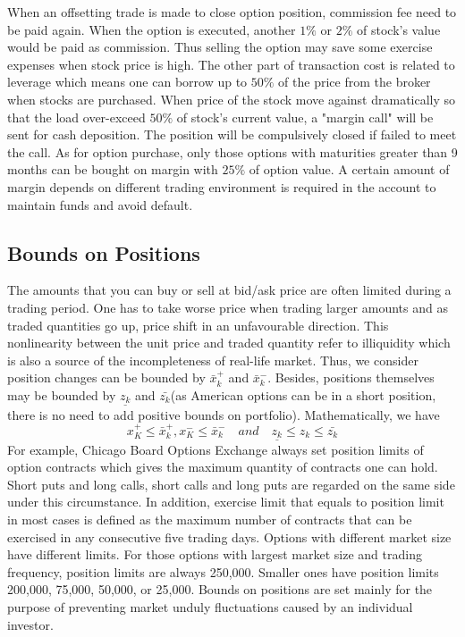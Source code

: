 When an offsetting trade is made to close option position, commission fee need to be paid again. When the option is executed, another $1\%$ or $2\%$ of stock's value would be paid as commission. Thus selling the option may save some exercise expenses when stock price is high. The other part of transaction cost is related to leverage which means one can borrow up to $50\%$ of the price from the broker when stocks are purchased. When price of the stock move against dramatically so that the load over-exceed $50\%$ of stock's current value, a "margin call" will be sent for cash deposition. The position will be compulsively closed if failed to meet the call. As for option purchase, only those options with maturities greater than 9 months can be bought on margin with $25\%$ of option value. A certain amount of margin depends on different trading environment is required in the account to maintain funds and avoid default. 
\subsection{Bounds on Positions}
The amounts that you can buy or sell at bid/ask price are often limited during a trading period. One has to take worse price when trading larger amounts and as traded quantities go up, price shift in an unfavourable direction. This nonlinearity between the unit price and traded quantity refer to illiquidity which is also a source of the incompleteness of real-life market. Thus, we consider position changes can be bounded by $\bar{x}_k^+$ and $\bar{x}_k^-$. Besides, positions themselves may be bounded by $\underline{z_k}$ and $\bar{z_k}$(as American options can be in a short position, there is no need to add positive bounds on portfolio). Mathematically, we have 
\begin{equation}
x_K^+\leq\bar{x}_k^+, x_K^-\leq\bar{x}_k^- \quad and \quad\underline{z_k}\leq z_k\leq\bar{z_k}
\end{equation}
For example, Chicago Board Options Exchange always set position limits of option contracts which gives the maximum quantity of contracts one can hold. Short puts and long calls, short calls and long puts are regarded on the same side under this circumstance. In addition, exercise limit that equals to position limit in most cases is defined as the maximum number of contracts that can be exercised in any consecutive five trading days. Options with different market size have different limits. For those options with largest market size and trading frequency, position limits are always 250,000. Smaller ones have position limits 200,000, 75,000, 50,000, or 25,000. Bounds on positions are set mainly for the purpose of preventing market unduly fluctuations caused by an individual investor. 
